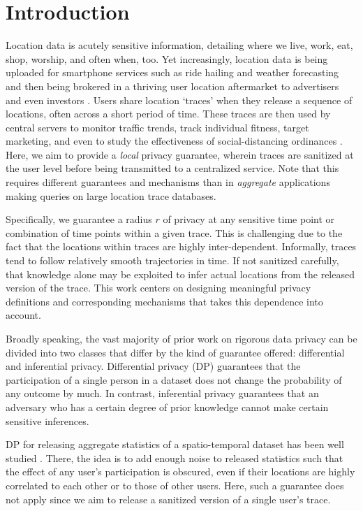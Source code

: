 \section{Introduction}
\label{sec:introduction}

Location data is acutely sensitive information, detailing where we live, work, eat, shop, worship, and often when, too. Yet increasingly, location data is being uploaded for smartphone services such as ride hailing and weather forecasting and then being brokered in a thriving user location aftermarket to advertisers and even investors \citep{nyt}. Users share location `traces' when they release a sequence of locations, often across a short period of time. These traces are then used by central servers to monitor traffic trends, track individual fitness, target marketing, and even to study the effectiveness of social-distancing ordinances \citep{wash_post}. Here, we aim to provide a \emph{local} privacy guarantee, wherein traces are sanitized at the user level before being transmitted to a centralized service. Note that this requires different guarantees and mechanisms than in \emph{aggregate} applications making queries on large location trace databases. 

Specifically, we guarantee a radius $r$ of privacy at any sensitive time point or combination of time points within a given trace. This is challenging due to the fact that the locations within traces are highly inter-dependent. Informally, traces tend to follow relatively smooth trajectories in time. If not sanitized carefully, that knowledge alone may be exploited to infer actual locations from the released version of the trace. This work centers on designing meaningful privacy definitions and corresponding mechanisms that takes this dependence into account. 


Broadly speaking, the vast majority of prior work on rigorous data privacy can be divided into two classes that differ by the kind of guarantee offered: differential and inferential privacy. Differential privacy (DP) guarantees that the participation of a single person in a dataset does not change the probability of any outcome by much. In contrast, inferential privacy guarantees that an adversary who has a certain degree of prior knowledge cannot make certain sensitive inferences.

DP for releasing aggregate statistics of a spatio-temporal dataset has been well studied \citep{traffic_monitoring, quantifying_dp_cao, bayesian_DP, dependent_dp}. There, the idea is to add enough noise to released statistics such that the effect of any user's participation is obscured, even if their locations are highly correlated to each other or to those of other users. Here, such a guarantee does not apply since we aim to release a sanitized version of a single user's trace.

